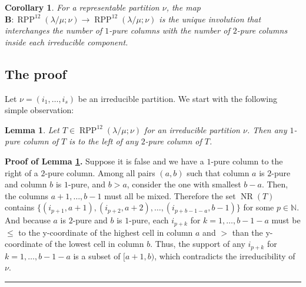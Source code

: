 \documentclass[12pt]{article}
\theoremstyle{plain}
\newtheorem{lemma}[theorem]{Lemma}
\newtheorem{corollary}[theorem]{Corollary}
\theoremstyle{definition}
\newenvironment{proof}[1][Proof]{\noindent\textbf{#1.} }{\ \rule{0.5em}{0.5em}}
\newcommand{\NN}{\mathbb{N}}
\def\seplistvar{{{\nu}}} %
\def\NS{{\operatorname{NR}}}
\def\OneTwoRPPCutvar{{\operatorname{RPP}^{12}\left(  \lambda/\mu ;\seplistvar \right)}}
\begin{document}
\begin{corollary}
 For a representable partition $\nu$, the map \newline $\mathbf{B}:\OneTwoRPPCutvar\to\OneTwoRPPCutvar$ is the unique involution that interchanges the number of $1$-pure columns with the number of $2$-pure columns inside each irreducible component.
\end{corollary}

\subsection{The proof}
Let $\seplistvar=(i_1,\dots,i_s)$ be an irreducible partition. We start with the following simple observation:
\begin{lemma}
\label{lemma:leftRight}
 Let $T\in\OneTwoRPPCutvar$ for an irreducible partition $\seplistvar$. Then any $1$-pure column of $T$ is to the left of any $2$-pure column of $T$.
\end{lemma}
\begin{proof}[Proof of Lemma \ref{lemma:leftRight}]
Suppose it is false and we have a $1$-pure column to the right of a $2$-pure column. Among all pairs $\left(a, b\right)$ such that column $a$ is $2$-pure and column $b$ is $1$-pure, and $b > a$, consider the one with smallest $b-a$. Then, the columns $a+1,\dots,b-1$ must all be mixed. %
Therefore the set $\NS(T)$ contains $\{(i_{p+1},a+1),(i_{p+2},a+2),\dots,(i_{p+b-1-a},b-1)\}$ for some $p\in\NN$. And because $a$ is $2$-pure and $b$ is $1$-pure, each $i_{p+k}$ for $k=1,\dots, b-1-a$ must be $\leq$ to the y-coordinate of the highest cell in column $a$ and $>$ than the y-coordinate of the lowest cell in column $b$. Thus, the support of any $i_{p+k}$ for $k=1,\dots, b-1-a$ is a subset of $[a+1,b)$, which contradicts the irreducibility of $\seplistvar$.
\end{proof}
\end{document}
